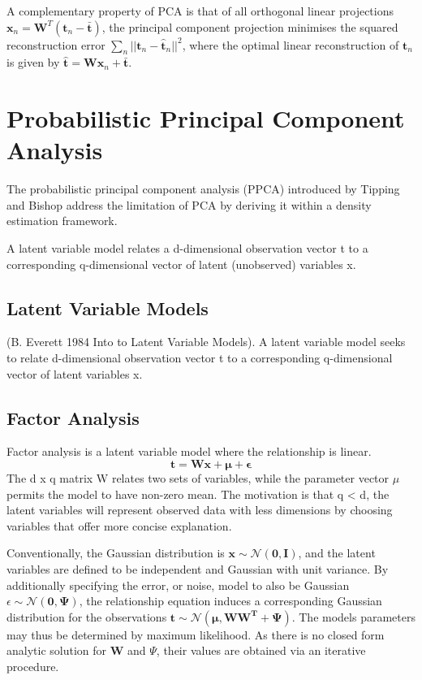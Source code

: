 \documentclass[ %
                    author={Dillon Keith Diep},
                supervisor={Dr. Carl Henrik Ek},
                    degree={MEng},
                     title={Assisted Content Generation for 3D Hair Geometry},
                  subtitle={[INCOMPLETE DRAFT, CONTAINS NOTES FROM RESEARCH]},
                      type={Research},
                      year={2014} ]{dissertation}
\begin{document}
A complementary property of PCA is that of all orthogonal linear projections $\mathbf{x}_n=\mathbf{W}^T(\mathbf{t}_n-\mathbf{\bar{t}})$, the principal component projection minimises the squared reconstruction error $\sum_n||\mathbf{t}_n-\mathbf{\hat{t}}_n||^2$, where the optimal linear reconstruction of $\mathbf{t}_n$ is given by $\mathbf{\hat{t}=Wx}_n+\mathbf{\bar{t}}$.

\section{Probabilistic Principal Component Analysis}
The probabilistic principal component analysis (PPCA) introduced by Tipping and Bishop address the limitation of PCA by deriving it within a density estimation framework.\cite{ppca}

A latent variable model relates a d-dimensional observation vector t to a corresponding q-dimensional vector of latent (unobserved) variables x.

\subsection{Latent Variable Models}
(B. Everett 1984 Into to Latent Variable Models).	
A latent variable model seeks to relate d-dimensional observation vector t to a corresponding q-dimensional vector of latent variables x.

\subsection{Factor Analysis}
Factor analysis is a latent variable model where the relationship is linear.
\begin{equation}
	\mathbf{t=Wx+\mu+\epsilon}
\end{equation}
The d x q matrix W relates two sets of variables, while the parameter vector $\mu$ permits the model to have non-zero mean. The motivation is that q < d, the latent variables will represent observed data with less dimensions by choosing variables that offer more concise explanation. 

Conventionally, the Gaussian distribution is $\mathbf{x}\sim\mathcal{N}(\mathbf{0,I})$, and the latent variables are defined to be independent and Gaussian with unit variance. By additionally specifying the error, or noise, model to also be Gaussian $\epsilon \sim\mathcal{N}(\mathbf{0, \Psi})$, the relationship equation induces a corresponding Gaussian distribution for the observations
$\mathbf{t\sim\mathcal{N}(\mu, \mathbf{WW}^T+\Psi)}$. The models parameters may thus be determined by maximum likelihood. As there is no closed form analytic solution for $\mathbf{W}$ and $\Psi$, their values are obtained via an iterative procedure.
\end{document}
